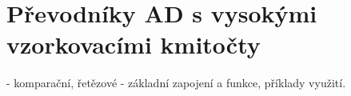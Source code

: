 \section{Převodníky AD s vysokými vzorkovacími kmitočty}
- komparační, řetězové - základní zapojení a funkce, příklady využití.